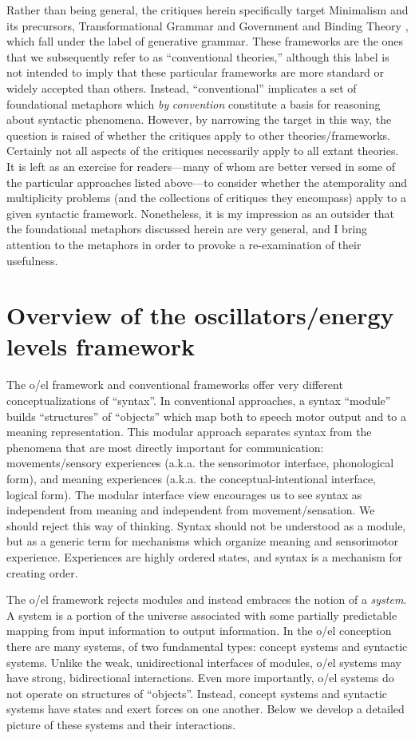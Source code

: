 Rather than being general, the critiques herein specifically target Minimalism and its precursors, Transformational Grammar \citep{Chomsky1965} and Government and Binding Theory \citep{Chomsky1982}, which fall under the label of generative grammar. These frameworks are the ones that we subsequently refer to as “conventional theories,” although this label is not intended to imply that these particular frameworks are more standard or widely accepted than others. Instead, “conventional” implicates a set of foundational metaphors which \textit{by} \textit{convention} constitute a basis for reasoning about syntactic phenomena. However, by narrowing the target in this way, the question is raised of whether the critiques apply to other theories/frameworks. Certainly not all aspects of the critiques necessarily apply to all extant theories. It is left as an exercise for readers—many of whom are better versed in some of the particular approaches listed above—to consider whether the atemporality and multiplicity problems (and the collections of critiques they encompass) apply to a given syntactic framework. Nonetheless, it is my impression as an outsider that the foundational metaphors discussed herein are very general, and I bring attention to the metaphors in order to provoke a re-examination of their usefulness.

\chapter{Overview of the oscillators/energy levels framework}
The o/el framework and conventional frameworks offer very different conceptualizations of “syntax”. In conventional approaches, a syntax “module” builds “structures” of “objects” which map both to speech motor output and to a meaning representation. This modular approach separates syntax from the phenomena that are most directly important for communication: movements/sensory experiences (a.k.a. the sensorimotor interface, phonological form), and meaning experiences (a.k.a. the conceptual-intentional interface, logical form). The modular interface view encourages us to see syntax as independent from meaning and independent from movement/sensation. We should reject this way of thinking. Syntax should not be understood as a module, but as a generic term for mechanisms which organize meaning and sensorimotor experience. Experiences are highly ordered states, and syntax is a mechanism for creating order. 

  The o/el framework rejects modules and instead embraces the notion of a \textit{system}. A system is a portion of the universe associated with some partially predictable mapping from input information to output information. In the o/el conception there are many systems, of two fundamental types: concept systems and syntactic systems. Unlike the weak, unidirectional interfaces of modules, o/el systems may have strong, bidirectional interactions. Even more importantly, o/el systems do not operate on structures of “objects”. Instead, concept systems and syntactic systems have states and exert forces on one another. Below we develop a detailed picture of these systems and their interactions. 

